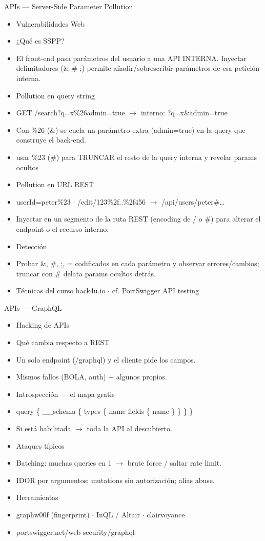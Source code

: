 \documentclass[aspectratio=169,10pt]{beamer}
\begin{document}
\begin{frame}[allowframebreaks]{APIs --- Server-Side Parameter Pollution}
\small
  \begin{itemize}
  \item Vulnerabilidades Web
  \item ¿Qué es SSPP?
  \item El front-end pasa parámetros del usuario a una API INTERNA. Inyectar delimitadores (\& \# ;) permite añadir/sobrescribir parámetros de esa petición interna.
  \item Pollution en query string
  \item GET /search?q=x\%26admin=true $\rightarrow$ interno: ?q=x\&admin=true
  \item Con \%26 (\&) se cuela un parámetro extra (admin=true) en la query que construye el back-end.
  \item usar \%23 (\#) para TRUNCAR el resto de la query interna y revelar params ocultos
  \item Pollution en URL REST
  \item userId=peter\%23 $\cdot$ /edit/123\%2f..\%2f456 $\rightarrow$ /api/users/peter\#\dots{}
  \item Inyectar en un segmento de la ruta REST (encoding de / o \#) para alterar el endpoint o el recurso interno.
  \item Detección
  \item Probar \&, \#, ;, = codificados en cada parámetro y observar errores/cambios; truncar con \# delata params ocultos detrás.
  \item Técnicas del curso hack4u.io $\cdot$ cf. PortSwigger API testing
  \end{itemize}
\end{frame}

\begin{frame}[allowframebreaks]{APIs --- GraphQL}
\small
  \begin{itemize}
  \item Hacking de APIs
  \item Qué cambia respecto a REST
  \item Un solo endpoint (/graphql) y el cliente pide los campos.
  \item Mismos fallos (BOLA, auth) + algunos propios.
  \item Introspección --- el mapa gratis
  \item query \{ \_\_schema \{ types \{ name fields \{ name \} \} \} \}
  \item Si está habilitada $\rightarrow$ toda la API al descubierto.
  \item Ataques típicos
  \item Batching: muchas queries en 1 $\rightarrow$ brute force / saltar rate limit.
  \item IDOR por argumentos; mutations sin autorización; alias abuse.
  \item Herramientas
  \item graphw00f (fingerprint) $\cdot$ InQL / Altair $\cdot$ clairvoyance
  \item portswigger.net/web-security/graphql
  \end{itemize}
\end{frame}
\end{document}
